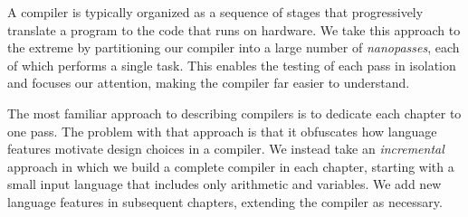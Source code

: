 \documentclass[7x10]{TimesAPriori_MIT}%
\numberwithin{theorem}{chapter}
\numberwithin{definition}{chapter}
\numberwithin{equation}{chapter}
\begin{document}
A compiler is typically organized as a sequence of stages that
progressively translate a program to the code that runs on
hardware. We take this approach to the extreme by partitioning our
compiler into a large number of \emph{nanopasses}, each of which
performs a single task. This enables the testing of each pass in
isolation and focuses our attention, making the compiler far easier to
understand.

The most familiar approach to describing compilers is to dedicate each
chapter to one pass. The problem with that approach is that it
obfuscates how language features motivate design choices in a
compiler. We instead take an \emph{incremental} approach in which we
build a complete compiler in each chapter, starting with a small input
language that includes only arithmetic and variables. We add new
language features in subsequent chapters, extending the compiler as
necessary.
\end{document}
